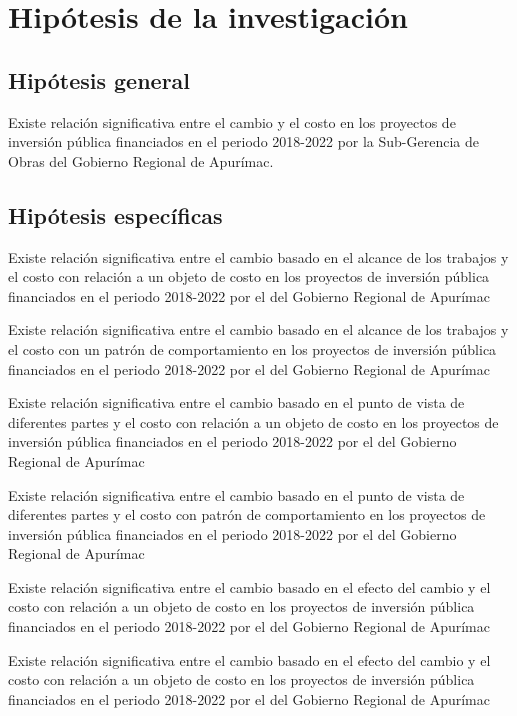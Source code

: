 \section{Hipótesis de la investigación}
\subsection{Hipótesis general}
Existe relación significativa entre el cambio y el costo en los proyectos de inversión pública financiados en el periodo 2018-2022 por la Sub-Gerencia de Obras  del Gobierno Regional de Apurímac.

\subsection{Hipótesis específicas}

Existe relación significativa entre el cambio basado en el alcance de los trabajos y el costo con relación a un objeto de costo en los proyectos de inversión pública financiados en el periodo 2018-2022 por el  del Gobierno Regional de Apurímac

Existe relación significativa entre el cambio basado en el alcance de los trabajos y el costo con un patrón de comportamiento en los proyectos de inversión pública financiados en el periodo 2018-2022 por el  del Gobierno Regional de Apurímac

Existe relación significativa entre el cambio basado en el punto de vista de diferentes partes y el costo con relación a un objeto de costo en los proyectos de inversión pública financiados en el periodo 2018-2022 por el  del Gobierno Regional de Apurímac

Existe relación significativa entre el cambio basado en el punto de vista de diferentes partes y el costo con patrón de comportamiento en los proyectos de inversión pública financiados en el periodo 2018-2022 por el  del Gobierno Regional de Apurímac

Existe relación significativa entre el cambio basado en el efecto del cambio y el costo con relación a un objeto de costo en los proyectos de inversión pública financiados en el periodo 2018-2022 por el  del Gobierno Regional de Apurímac

Existe relación significativa entre el cambio basado en el efecto del cambio y el costo con relación a un objeto de costo en los proyectos de inversión pública financiados en el periodo 2018-2022 por el  del Gobierno Regional de Apurímac

